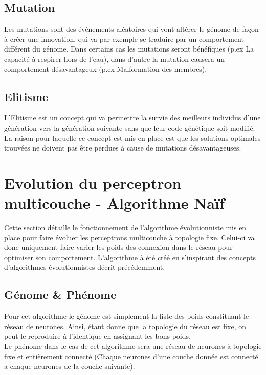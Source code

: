 \documentclass{article}
\begin{document}
\subsection{Mutation}

Les mutations sont des événements aléatoires qui vont altérer le génome de façon à créer une innovation, qui va par exemple se traduire par un comportement différent du génome. Dans certains cas les mutations seront bénéfiques (p.ex La capacité à respirer hors de l'eau), dans d'autre la mutation causera un comportement désavantageux (p.ex Malformation des membres).\cite{wikimutation}\\

\subsection{Elitisme}

L'Elitisme est un concept qui va permettre la survie des meilleurs individus d'une génération vers la génération suivante sans que leur code génétique soit modifié.\cite{elitism}\\
La raison pour laquelle ce concept est mis en place est que les solutions optimales trouvées ne doivent pas être perdues à cause de mutations désavantageuses.


\newpage
\section{Evolution du perceptron multicouche - Algorithme Naïf}

Cette section détaille le fonctionnement de l'algorithme évolutionniste mis en place pour faire évoluer les perceptrons multicouche à topologie fixe. Celui-ci va donc uniquement faire varier les poids des connexion dans le réseau pour optimiser son comportement. L'algorithme à été créé en s'inspirant des concepts d'algorithmes évolutionnistes décrit précédemment.

\subsection{Génome \& Phénome}

Pour cet algorithme le génome est simplement la liste des poids constituant le réseau de neurones. Ainsi, étant donne que la topologie du réseau est fixe, on peut le reproduire à l'identique en assignant les bons poids.\\

Le phénome dans le cas de cet algorithme sera une réseau de neurones à topologie fixe et entièrement connecté (Chaque neurones d'une couche donnée est connecté a chaque neurones de la couche suivante).
\end{document}
